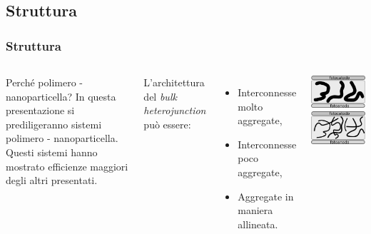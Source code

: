 \documentclass{beamer}
\begin{document}
  \subsection{Struttura}
    \begin{frame}
      \frametitle{
      Struttura}
      \begin{columns}
	\begin{block}{Perché polimero - nanoparticella?}
	In questa presentazione si prediligeranno sistemi polimero - nanoparticella. Questi sistemi hanno mostrato efficienze maggiori degli altri presentati. 
      \end{block}\pause

	L'architettura del \emph{bulk heterojunction} può essere:
	  \begin{itemize}\pause
	   \item Interconnesse molto aggregate,
	    \item Interconnesse poco aggregate,
	    \item Aggregate in maniera allineata.
	  \end{itemize}
	 \includegraphics[scale=0.18]{immagini/interconnessi_molto_aggregati.png}\\\vskip 10pt
	  \includegraphics[scale=0.18]{immagini/interconnessi_poco_aggregati.png}\\\vskip 10pt

\end{columns}
\end{frame}
\end{document}
